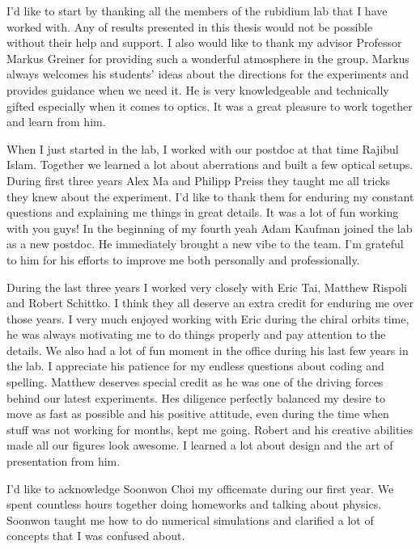 
I'd like to start by thanking all the members of the rubidium lab that I have worked with. Any of results presented in this thesis would not be possible without their help and support. I also would like to thank my advisor Professor Markus Greiner for providing such a wonderful atmosphere in the group. Markus always welcomes his students' ideas about the directions for the experiments and provides guidance when we need it. He is very knowledgeable and technically gifted especially when it comes to optics. It was a great pleasure to work together and learn from him.

When I just started in the lab, I worked with our postdoc at that time Rajibul Islam. Together we learned a lot about aberrations and built a few optical setups. During first three years Alex Ma and Philipp Preiss they taught me all tricks they knew about the experiment. I'd like to thank them for enduring my constant questions and explaining me things in great details. It was a  lot of fun working with you guys! In the beginning of my fourth yeah Adam Kaufman joined the lab as a new postdoc. He immediately brought a new vibe to the team. I'm grateful to him for his efforts to improve me both personally and professionally.

During the last three years I worked very closely with Eric Tai, Matthew Rispoli and Robert Schittko. I think they all deserve an extra credit for enduring me over those years. I very much enjoyed working with Eric during the chiral orbits time, he was always motivating me to do things properly and pay attention to the details. We also had a lot of fun moment in the office during his last few years in the lab. I appreciate his patience for my endless questions about coding and spelling. Matthew deserves special credit as he was one of the driving forces behind our latest experiments. Hes diligence perfectly balanced my desire to move as fast as possible and his positive attitude, even during the time when stuff was not working for months, kept me going. Robert and his creative abilities made all our figures look awesome. I learned a lot about design and the art of presentation from him.

I'd like to acknowledge Soonwon Choi my officemate during our first year. We spent countless hours together doing homeworks and talking about physics. Soonwon taught me how to do numerical simulations and clarified a lot of concepts that I was confused about.

